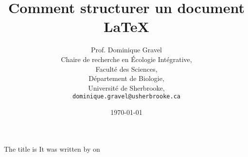 \documentclass[12pt]{article}
\title{Comment structurer un document \LaTeX{}}
\author{Prof. Dominique Gravel\\
   Chaire de recherche en Écologie Intégrative,\\
   Faculté des Sciences,\\
   Département de Biologie,\\
   Université de Sherbrooke,\\
   \texttt{dominique.gravel@usherbrooke.ca}}
\date{\today}
\begin{document}
\begin{titlepage}

The title is \@title
It was written by \@author\space on \@date

\end{titlepage}
\end{document}
